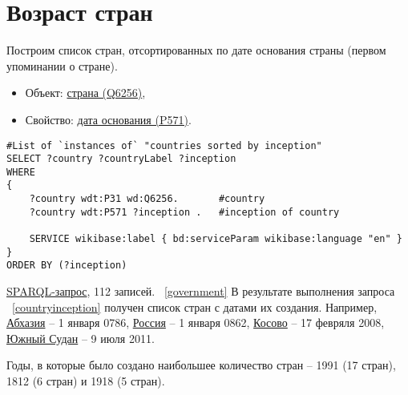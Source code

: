 \section{Возраст стран}

Построим список стран, отсортированных по дате основания страны (первом упоминании о стране).

\begin{itemize}
    \item Объект: \href{https://www.wikidata.org/wiki/Q6256}{страна (Q6256)},
    \item Свойство: \href{https://www.wikidata.org/wiki/Property:P571}{дата основания (P571)}.
\end{itemize}

\begin{lstlisting}[language=SPARQL label=countryinception, caption=Список стран упорядоченных по дате создания]
#List of `instances of` "countries sorted by inception" 
SELECT ?country ?countryLabel ?inception
WHERE
{
    ?country wdt:P31 wd:Q6256.       #country
    ?country wdt:P571 ?inception .   #inception of country
    
    SERVICE wikibase:label { bd:serviceParam wikibase:language "en" }
}
ORDER BY (?inception)
\end{lstlisting}


\href{https://query.wikidata.org/#%23List%20of%20%60instances%20of%60%20%22countries%20sorted%20by%20inception%22%20%0ASELECT%20%3Fcountry%20%3FcountryLabel%20%3Finception%0AWHERE%0A%7B%0A%20%20%20%20%3Fcountry%20wdt%3AP31%20wd%3AQ6256.%0A%20%20%20%20%3Fcountry%20wdt%3AP571%20%3Finception%20.%0A%20%20%20%20%0A%20%20%20%20SERVICE%20wikibase%3Alabel%20%7B%20bd%3AserviceParam%20wikibase%3Alanguage%20%22en%22%20%7D%0A%7D%0A%0AORDER%20BY%20%28%3Finception%29}{SPARQL-запрос}, 112 записей.
~\ref{government}
В результате выполнения запроса ~\ref{countryinception} получен список стран с датами их создания. Например, \href{https://www.wikidata.org/wiki/Q23334}{Абхазия} -- 1 января 0786, \href{https://www.wikidata.org/wiki/Q159}{Россия} -- 1 января 0862, \href{https://www.wikidata.org/wiki/Q1246}{Косово} -- 17 февряля 2008, \href{https://www.wikidata.org/wiki/Q958}{Южный Судан} -- 9 июля 2011.

Годы, в которые было создано наибольшее количество стран -- 1991 (17 стран), 1812 (6 стран) и 1918 (5 стран). 